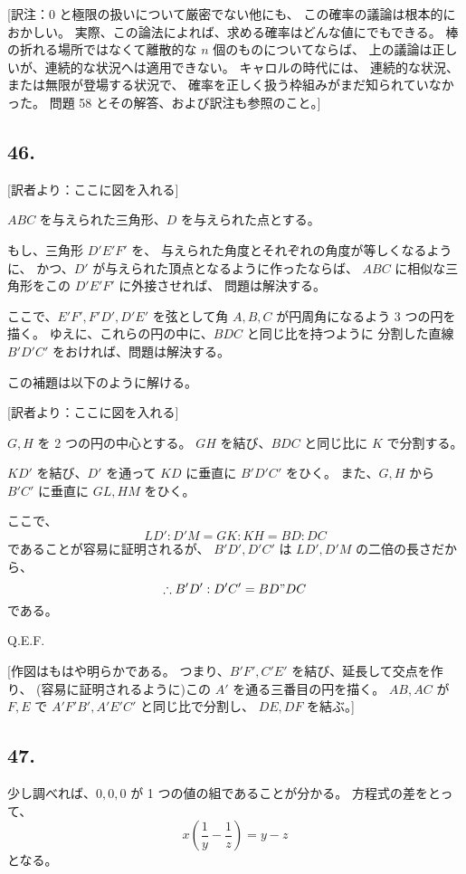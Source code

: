[訳注：$0$ と極限の扱いについて厳密でない他にも、
この確率の議論は根本的におかしい。
実際、この論法によれば、求める確率はどんな値にでもできる。
棒の折れる場所ではなくて離散的な $n$ 個のものについてならば、
上の議論は正しいが、連続的な状況へは適用できない。
キャロルの時代には、
連続的な状況、または無限が登場する状況で、
確率を正しく扱う枠組みがまだ知られていなかった。
問題 58 とその解答、および訳注も参照のこと。]


\subsection*{46.}

[訳者より：ここに図を入れる] 

$ABC$ を与えられた三角形、$D$ を与えられた点とする。

もし、三角形 $D'E'F'$ を、
与えられた角度とそれぞれの角度が等しくなるように、
かつ、$D'$  が与えられた頂点となるように作ったならば、
$ABC$ に相似な三角形をこの $D'E'F'$ に外接させれば、
問題は解決する。

ここで、$E'F', F'D', D'E'$ を弦として角 $A, B, C$ が円周角になるよう
 3 つの円を描く。
ゆえに、これらの円の中に、$BDC$ と同じ比を持つように
分割した直線 $B'D'C'$ をおければ、問題は解決する。

この補題は以下のように解ける。

[訳者より：ここに図を入れる] 

$G, H$ を 2 つの円の中心とする。
$GH$ を結び、$BDC$ と同じ比に $K$ で分割する。

$KD'$ を結び、$D'$ を通って $KD$ に垂直に $B'D'C'$ をひく。
また、$G, H$ から $B'C'$ に垂直に $GL, HM$ をひく。

ここで、
\[
LD' : D'M = GK : KH = BD : DC
\]
であることが容易に証明されるが、
$B'D', D'C'$ は $LD', D'M$ の二倍の長さだから、
\[
\therefore
B'D' : D'C' = BD " DC
\]
である。

Q.E.F.

[作図はもはや明らかである。
つまり、$B'F', C'E'$ を結び、延長して交点を作り、
(容易に証明されるように)この $A'$ を通る三番目の円を描く。
$AB, AC$ が $F, E$ で $A'F'B', A'E'C'$ と同じ比で分割し、
$DE, DF$ を結ぶ。]

\subsection*{47.}

少し調べれば、$0, 0, 0$ が 1 つの値の組であることが分かる。
方程式の差をとって、
\[
x \left( \frac{1}{y} - \frac{1}{z} \right) = y - z
\]
となる。

